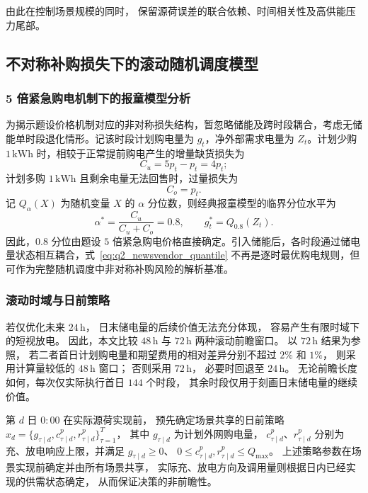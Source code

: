 \documentclass[zihao=-4,a4paper,UTF8,fontset=none]{ctexart}
\begin{document}
由此在控制场景规模的同时，
保留源荷误差的联合依赖、时间相关性及高供能压力尾部。
\subsection{不对称补购损失下的滚动随机调度模型}

\subsubsection{5 倍紧急购电机制下的报童模型分析}
\label{subsec:q2_newsvendor}

为揭示题设价格机制对应的非对称损失结构，暂忽略储能及跨时段耦合，考虑无储能单时段退化情形。记该时段计划购电量为 $g_t$，净外部需求电量为 $Z_t$。计划少购 $1\,\mathrm{kWh}$ 时，相较于正常提前购电产生的增量缺货损失为
\[
C_u=5p_t-p_t=4p_t;
\]
计划多购 $1\,\mathrm{kWh}$ 且剩余电量无法回售时，过量损失为
\[
C_o=p_t.
\]
记 $Q_{\alpha}(X)$ 为随机变量 $X$ 的 $\alpha$ 分位数，则经典报童模型的临界分位水平为
\begin{equation}
    \alpha^*
    =
    \frac{C_u}{C_u+C_o}
    =
    0.8,
    \qquad
    g_t^*
    =
    Q_{0.8}(Z_t).
    \label{eq:q2_newsvendor_quantile}
\end{equation}
因此，$0.8$ 分位由题设 $5$ 倍紧急购电价格直接确定。引入储能后，各时段通过储电量状态相互耦合，式~\eqref{eq:q2_newsvendor_quantile} 不再是逐时最优购电规则，但可作为完整随机调度中非对称补购风险的解析基准。


\subsubsection{滚动时域与日前策略}

若仅优化未来 $24\,\mathrm h$，
日末储电量的后续价值无法充分体现，
容易产生有限时域下的短视放电。
因此，本文比较 $48\,\mathrm h$ 与 $72\,\mathrm h$ 两种滚动前瞻窗口。
以 $72\,\mathrm h$ 结果为参照，
若二者首日计划购电量和期望费用的相对差异分别不超过
$2\%$ 和 $1\%$，
则采用计算量较低的 $48\,\mathrm h$ 窗口；
否则采用 $72\,\mathrm h$，
必要时回退至 $24\,\mathrm h$。
无论前瞻长度如何，每次仅实际执行首日 $144$ 个时段，
其余时段仅用于刻画日末储电量的继续价值。

第 $d$ 日 $0{:}00$ 在实际源荷实现前，
预先确定场景共享的日前策略
$x_d=\{g_{\tau\mid d},c_{\tau\mid d}^{p},
r_{\tau\mid d}^{p}\}_{\tau=1}^{T}$，
其中 $g_{\tau\mid d}$ 为计划外网购电量，
$c_{\tau\mid d}^{p}$、$r_{\tau\mid d}^{p}$
分别为充、放电响应上限，并满足
$g_{\tau\mid d}\ge0$、
$0\le c_{\tau\mid d}^{p},r_{\tau\mid d}^{p}\le Q_{\max}$。
上述策略参数在场景实现前确定并由所有场景共享，
实际充、放电方向及调用量则根据日内已经实现的供需状态确定，
从而保证决策的非前瞻性。
\end{document}
